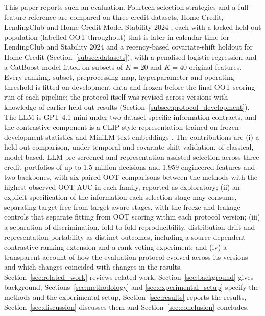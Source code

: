 \documentclass[final,5p,twocolumn]{elsarticle}
\newcommand{\Kfeat}{K}
\begin{document}
This paper reports such an evaluation. Fourteen selection strategies and a full-feature reference are compared on three credit datasets, Home Credit, LendingClub and Home Credit Model Stability 2024 \cite{homecredit2018,lendingclub_kaggle,homecredit2024}, each with a locked held-out population (labelled OOT throughout) that is later in calendar time for LendingClub and Stability 2024 and a recency-based covariate-shift holdout for Home Credit (Section~\ref{subsec:datasets}), with a penalised logistic regression and a CatBoost model \cite{prokhorenkova2018} fitted on subsets of $\Kfeat=20$ and $\Kfeat=40$ original features. Every ranking, subset, preprocessing map, hyperparameter and operating threshold is fitted on development data and frozen before the final OOT scoring run of each pipeline; the protocol itself was revised across versions with knowledge of earlier held-out results (Section~\ref{subsec:protocol_development}). The LLM is GPT-4.1 mini \cite{openai2025gpt41} under two dataset-specific information contracts, and the contrastive component is a CLIP-style representation trained on frozen development statistics and MiniLM text embeddings \cite{wang2020minilm,reimers2019}. The contributions are (i) a held-out comparison, under temporal and covariate-shift validation, of classical, model-based, LLM pre-screened and representation-assisted selection across three credit portfolios of up to 1.5 million decisions and 1,959 engineered features and two backbones, with six paired OOT comparisons between the methods with the highest observed OOT AUC in each family, reported as exploratory; (ii) an explicit specification of the information each selection stage may consume, separating target-free from target-aware stages, with the freeze and leakage controls that separate fitting from OOT scoring within each protocol version; (iii) a separation of discrimination, fold-to-fold reproducibility, distribution drift and representation portability as distinct outcomes, including a source-dependent contrastive-ranking extension and a rank-voting experiment; and (iv) a transparent account of how the evaluation protocol evolved across its versions and which changes coincided with changes in the results. Section~\ref{sec:related_work} reviews related work, Section~\ref{sec:background} gives background, Sections~\ref{sec:methodology} and \ref{sec:experimental_setup} specify the methods and the experimental setup, Section~\ref{sec:results} reports the results, Section~\ref{sec:discussion} discusses them and Section~\ref{sec:conclusion} concludes.
\end{document}
